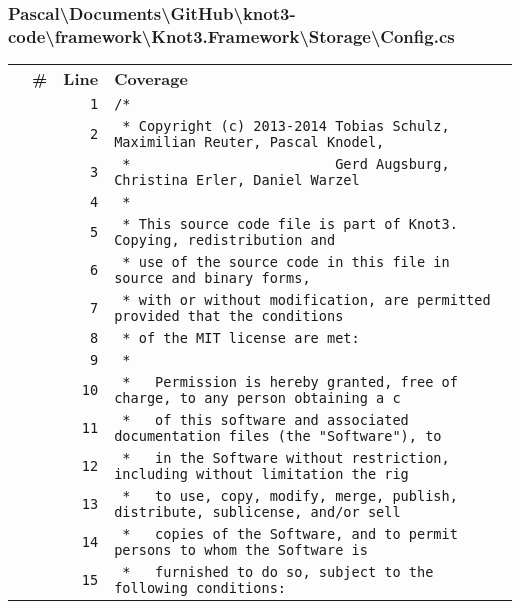 \documentclass[a4paper,10pt]{article}
\begin{document}
\subsubsection{Pascal\textbackslash Documents\textbackslash GitHub\textbackslash knot3-code\textbackslash framework\textbackslash Knot3.Framework\textbackslash Storage\textbackslash Config.cs}
\begin{longtable}[l]{lrrl}
\textbf{} & \textbf{\#} & \textbf{Line} & \textbf{Coverage}\\
\cellcolor{gray} &  & \verb~1~ & \verb~/*~\\
\cellcolor{gray} &  & \verb~2~ & \verb~ * Copyright (c) 2013-2014 Tobias Schulz, Maximilian Reuter, Pascal Knodel,~\\
\cellcolor{gray} &  & \verb~3~ & \verb~ *                         Gerd Augsburg, Christina Erler, Daniel Warzel~\\
\cellcolor{gray} &  & \verb~4~ & \verb~ *~\\
\cellcolor{gray} &  & \verb~5~ & \verb~ * This source code file is part of Knot3. Copying, redistribution and~\\
\cellcolor{gray} &  & \verb~6~ & \verb~ * use of the source code in this file in source and binary forms,~\\
\cellcolor{gray} &  & \verb~7~ & \verb~ * with or without modification, are permitted provided that the conditions~\\
\cellcolor{gray} &  & \verb~8~ & \verb~ * of the MIT license are met:~\\
\cellcolor{gray} &  & \verb~9~ & \verb~ *~\\
\cellcolor{gray} &  & \verb~10~ & \verb~ *   Permission is hereby granted, free of charge, to any person obtaining a c~\\
\cellcolor{gray} &  & \verb~11~ & \verb~ *   of this software and associated documentation files (the "Software"), to ~\\
\cellcolor{gray} &  & \verb~12~ & \verb~ *   in the Software without restriction, including without limitation the rig~\\
\cellcolor{gray} &  & \verb~13~ & \verb~ *   to use, copy, modify, merge, publish, distribute, sublicense, and/or sell~\\
\cellcolor{gray} &  & \verb~14~ & \verb~ *   copies of the Software, and to permit persons to whom the Software is~\\
\cellcolor{gray} &  & \verb~15~ & \verb~ *   furnished to do so, subject to the following conditions:~\\

\end{longtable}
\end{document}
